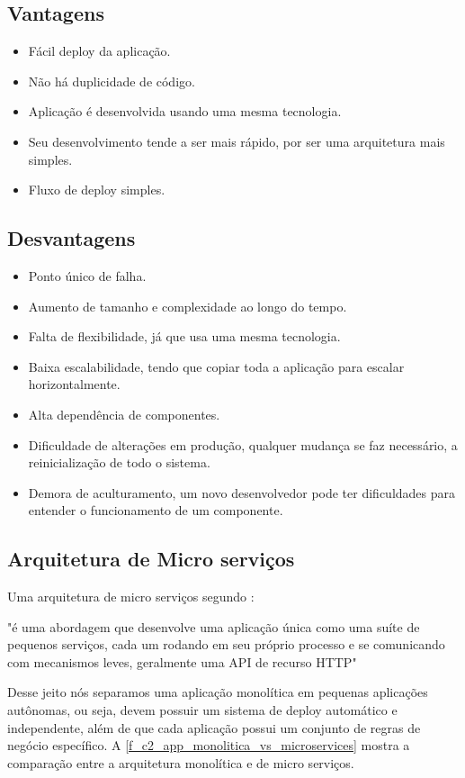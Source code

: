 \subsection*{Vantagens}
\begin{itemize}
	\item Fácil deploy da aplicação.
	\item Não há duplicidade de código.
	\item Aplicação é desenvolvida usando uma mesma tecnologia.
	\item Seu desenvolvimento tende a ser mais rápido, por ser uma arquitetura mais simples.
	\item Fluxo de deploy simples.
\end{itemize}

\subsection*{Desvantagens}
\begin{itemize}
	\item Ponto único de falha.
	\item Aumento de tamanho e complexidade ao longo do tempo.
	\item Falta de flexibilidade, já que usa uma mesma tecnologia.
	\item Baixa escalabilidade, tendo que copiar toda a aplicação para escalar horizontalmente.
	\item Alta dependência de componentes.
	\item Dificuldade de alterações em produção, qualquer mudança se faz necessário, a reinicialização de todo o sistema.
	\item Demora de aculturamento, um novo desenvolvedor pode ter dificuldades para entender o funcionamento de um componente.
\end{itemize}

\subsection{Arquitetura de Micro serviços}
Uma arquitetura de micro serviços segundo \cite{microservices2014}:  \begin{citacao}"é uma abordagem que desenvolve uma aplicação única como uma suíte de pequenos serviços, cada um rodando em seu próprio processo e se comunicando com mecanismos leves, geralmente uma \ac{API} de recurso \ac{HTTP}" \end{citacao} Desse jeito nós separamos uma aplicação monolítica em pequenas aplicações autônomas, ou seja, devem possuir um sistema de deploy automático e independente, além de que cada aplicação possui um conjunto de regras de negócio específico. A \autoref{f_c2_app_monolitica_vs_microservices} mostra a comparação entre a arquitetura monolítica e de micro serviços.



